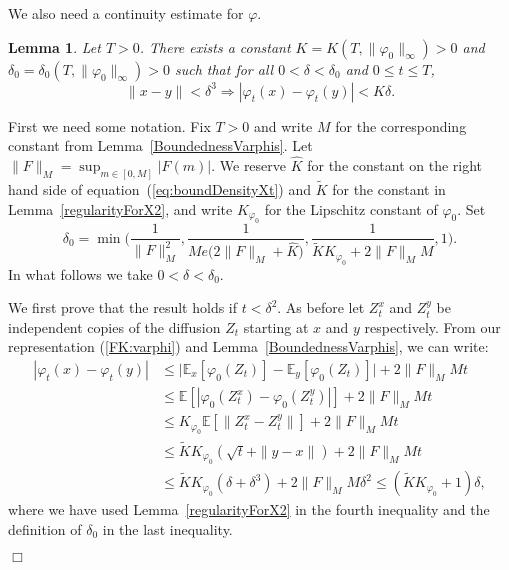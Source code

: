\documentclass[12pt]{article}
\newenvironment {proof}{{\noindent\bf Proof }}{\hfill $\Box$ \medskip}
\newtheorem{lemma}[theorem]{Lemma}
\newcommand{\IE}{\mathbb E}
\numberwithin{equation}{section}
\begin{document}
We also need a continuity estimate for $\varphi$.
\begin{lemma} 
\label{ContinuityVarphi}
Let $T>0$. There exists a constant 
$K=K(T, \| \varphi_0\|_\infty)>0$ and 
$\delta_0=\delta_0(T, \| \varphi_0\|_\infty) >0$ such that 
for all $0 < \delta<\delta_0$ and $0 \leq t \leq T$,
\[ 
 \|x-y\|<\delta^3 \Rightarrow |\varphi_t(x)-\varphi_t(y)|< K\delta.
\]
\end{lemma}
\begin{proof}
First we need some notation. 
Fix $T>0$ and write $M$ for the corresponding constant from 
Lemma~\ref{BoundednessVarphis}.
Let $\| F \|_{M} = \sup_{m \in [0,M]} |F(m)|$.
We reserve $\widehat{K}$ for the constant on the right hand side of 
equation~(\ref{eq:boundDensityXt})
and $\widetilde{K}$ for the constant in Lemma~\ref{regularityForX2},
and write $K_{\varphi_0}$ for the Lipschitz constant of 
$\varphi_0$. Set 
\[ 
\delta_0=\min\Big( \frac{1}{\| F \|_M^{2}},\frac{1}{M e\big(2\| F \|_{M}+ \widehat{K}\big)}, 
    \frac{1}{\widetilde{K} K_{\varphi_0} + 2 \| F \|_M M},  1\Big).
\]
In what follows we take $0< \delta<\delta_0$. 

We first prove that the result holds if $t < \delta^2$. As before
let $Z_t^x$ and $Z_t^y$ be 
independent copies of the diffusion $Z_t$ starting at $x$ and $y$ respectively. 
From our representation (\ref{FK:varphi}) and 
Lemma~\ref{BoundednessVarphis}, we can write:
\begin{align*}
|\varphi_t(x)- \varphi_t(y)| 
&\leq \big|\IE_x[\varphi_0(Z_t)]-\IE_y[\varphi_0(Z_t)]\big| 
    + 2 \| F \|_M M t \\ 
& \leq \IE[|\varphi_0(Z_t^x)-\varphi_0(Z_t^y)|] 
    + 2 \| F \|_M M t  \\ 
&\leq K_{\varphi_0}  \IE[\|Z_t^x-Z_t^y\|] 
    + 2 \| F \|_M M t \\ 
& \leq \widetilde{K} K_{\varphi_0}  (\sqrt{t} + \|y-x\|) 
    + 2 \| F \|_M M t \\ 
& \leq \widetilde{K} K_{\varphi_0} (\delta + \delta^3) 
    + 2 \| F \|_M M \delta^2 
\leq (\widetilde{K} K_{\varphi_0} +1)\delta,
\end{align*}
where we have used Lemma~\ref{regularityForX2} in the fourth inequality and the definition of $\delta_0$ in the last inequality.


\end{proof}
\end{document}
